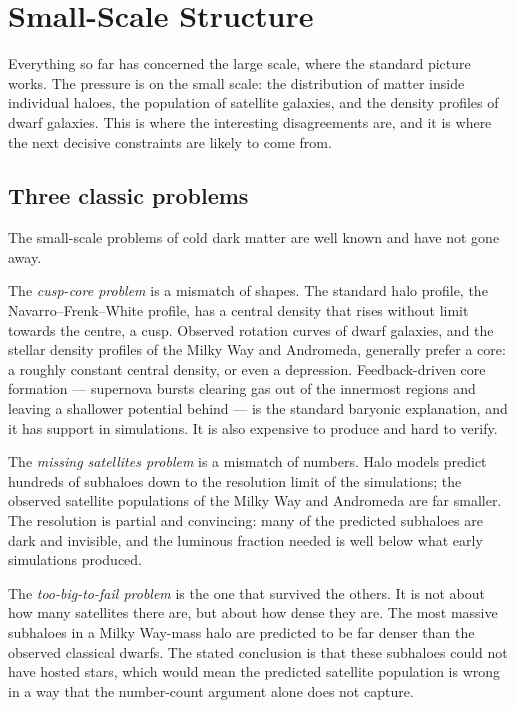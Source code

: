 
\chapter{Small-Scale Structure}
\label{ch:smallscale}

Everything so far has concerned the large scale, where the standard picture
works. The pressure is on the small scale: the distribution of matter inside
individual haloes, the population of satellite galaxies, and the density
profiles of dwarf galaxies. This is where the interesting disagreements are,
and it is where the next decisive constraints are likely to come from.

\section{Three classic problems}The small-scale problems of cold dark matter are
well known and have not gone away.

The \emph{cusp-core problem} is a mismatch of shapes. The standard halo
profile, the Navarro--Frenk--White profile, has a central density that rises
without limit towards the centre, a cusp. Observed rotation curves of dwarf
galaxies, and the stellar density profiles of the Milky Way and Andromeda,
generally prefer a core: a roughly constant central density, or even a
depression. Feedback-driven core formation --- supernova bursts clearing
gas out of the innermost regions and leaving a shallower potential behind ---
is the standard baryonic explanation, and it has support in simulations. It
is also expensive to produce and hard to verify.

The \emph{missing satellites problem} is a mismatch of numbers. Halo models
predict hundreds of subhaloes down to the resolution limit of the simulations;
the observed satellite populations of the Milky Way and Andromeda are far
smaller. The resolution is partial and convincing: many of the predicted
subhaloes are dark and invisible, and the luminous fraction needed is well
below what early simulations produced.

The \emph{too-big-to-fail problem} is the one that survived the others. It
is not about how many satellites there are, but about how dense they are. The
most massive subhaloes in a Milky Way-mass halo are predicted to be far
denser than the observed classical dwarfs. The stated conclusion is that
these subhaloes could not have hosted stars, which would mean the predicted
satellite population is wrong in a way that the number-count argument alone
does not capture.

